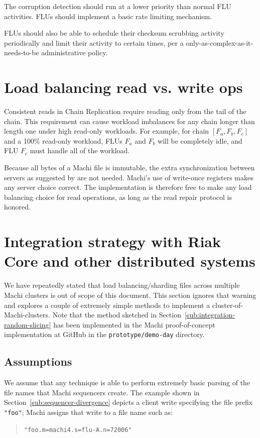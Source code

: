 \documentclass[preprint,10pt]{sigplanconf}
\begin{document}
The corruption detection should run at a lower priority than normal
FLU activities.  FLUs should implement a basic rate limiting
mechanism.

FLUs should also be able to schedule their checksum scrubbing activity
periodically and limit their activity to certain times, per a
only-as-complex-as-it-needs-to-be administrative policy.

\section{Load balancing read vs. write ops}
\label{sec:load-balancing}

Consistent reads in Chain Replication require reading only from the
tail of the chain.  This requirement can cause workload imbalances for
any chain longer than length one under high read-only workloads.  For
example, for chain $[F_a, F_b, F_c]$ and a 100\% read-only workload,
FLUs $F_a$ and $F_b$ will be completely idle, and FLU $F_c$ must
handle all of the workload.

Because all bytes of a Machi file is immutable, the extra
synchronization between servers as suggested by \cite{cr-craq} are not
needed.
Machi's use of write-once registers makes any server choice correct.
The implementation is
therefore free to make any load balancing choice for read operations,
as long as the read repair protocol is honored.

\section{Integration strategy with Riak Core and other distributed systems}
\label{sec:integration}

We have repeatedly stated that load balancing/sharding files across
multiple Machi clusters is out of scope of this document.  This
section ignores that warning and explores a couple of extremely simple
methods to implement a cluster-of-Machi-clusters.  Note that the
method sketched in Section~\ref{sub:integration-random-slicing} has
been implemented in the Machi proof-of-concept implementation at
GitHub in the {\tt prototype/demo-day} directory.

\subsection{Assumptions}

We assume that any technique is able to perform extremely basic
parsing of the file names that Machi sequencers create.  The example
shown in Section~\ref{sub:sequencer-divergence} depicts a client write
specifying the file prefix {\tt "foo"}; Machi assigns that write to a
file name such as:
\begin{quote}
{\tt "foo.m=machi4.s=flu-A.n=72006"}
\end{quote}
\end{document}
